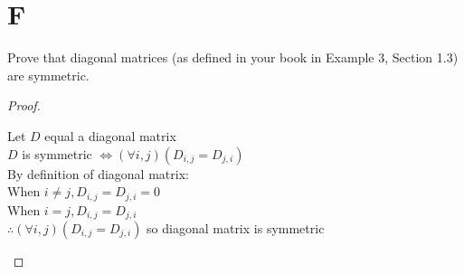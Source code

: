 \documentclass[11pt]{scrartcl}
\begin{document}
\section{F}
Prove that diagonal matrices (as defined in your book in Example 3, Section 1.3) are symmetric.

\begin{proof}
	\-\
	\begin{center}
	Let $D$ equal a diagonal matrix \\
	$D$ is symmetric $\Leftrightarrow (\forall i,j)(D_{i,j} = D_{j,i})$\\
	By definition of diagonal matrix:\\
	When $i \neq j, D_{i,j} = D_{j,i} = 0$\\
	When $i = j, D_{i,j} = D_{j,i}$\\
	$\therefore (\forall i,j)(D_{i,j} = D_{j,i})$ so diagonal matrix is symmetric
\end{center}
\end{proof}
\end{document}
